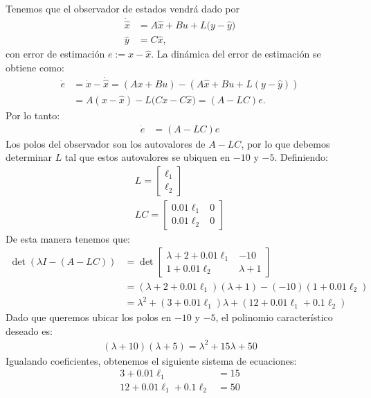 \documentclass[
  11pt,
  letterpaper,
   addpoints,
   answers
  ]{exam}
\begin{document}
\begin{solution}
Tenemos que el observador de estados vendrá dado por
\begin{align}
\dot{\hat x} &= A\hat x + Bu + L\big(y-\hat y\big)\\
\hat y &= C\hat x,
\end{align}
con error de estimación $e:=x-\hat x$. La dinámica del error de estimación se obtiene como:
\begin{align}
\dot e
&= \dot x - \dot{\hat x}
= (Ax+Bu) - (A\hat x + Bu + L(y-\hat y)) \\
&= A(x-\hat x) - L\big(Cx - C\hat x\big)
= (A-LC)e. \label{eq:error_dyn}
\end{align}
Por lo tanto:
\begin{align}
\dot e &= (A-LC)e
\end{align}
Los polos del observador son los autovalores de $A-LC$, por lo que debemos determinar $L$ tal que estos autovalores se ubiquen en $-10$ y $-5$. Definiendo:
\begin{align}
  L= \begin{bmatrix} \ell_1 \\ \ell_2 \end{bmatrix}\\
  LC = \begin{bmatrix} 0.01\ell_1 & 0 \\ 0.01\ell_2 & 0 \end{bmatrix}
\end{align}
De esta manera tenemos que:
\begin{align}
  \det(\lambda I - (A-LC)) &= \det\begin{bmatrix} \lambda + 2 + 0.01\ell_1 & -10 \\ 1 + 0.01\ell_2 & \lambda + 1 \end{bmatrix} \\
  &= (\lambda + 2 + 0.01\ell_1)(\lambda + 1) - (-10)(1 + 0.01\ell_2) \\
  &= \lambda^2 + (3 + 0.01\ell_1)\lambda + (12 + 0.01\ell_1 + 0.1\ell_2)
\end{align}
Dado que queremos ubicar los polos en $-10$ y $-5$, el polinomio característico deseado es:
\begin{align}
  (\lambda + 10)(\lambda + 5) = \lambda^2 + 15\lambda + 50
\end{align}
Igualando coeficientes, obtenemos el siguiente sistema de ecuaciones:
\begin{align}
  3 + 0.01\ell_1 &= 15 \\
  12 + 0.01\ell_1 + 0.1\ell_2 &= 50
\end{align}

\end{solution}
\end{document}
